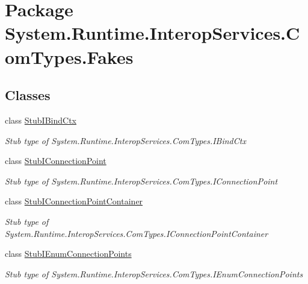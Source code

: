 \hypertarget{namespace_system_1_1_runtime_1_1_interop_services_1_1_com_types_1_1_fakes}{\section{Package System.\-Runtime.\-Interop\-Services.\-Com\-Types.\-Fakes}
\label{namespace_system_1_1_runtime_1_1_interop_services_1_1_com_types_1_1_fakes}
}
\subsection*{Classes}
\begin{DoxyCompactItemize}
\item 
class \hyperlink{class_system_1_1_runtime_1_1_interop_services_1_1_com_types_1_1_fakes_1_1_stub_i_bind_ctx}{Stub\-I\-Bind\-Ctx}
\begin{DoxyCompactList}\small\item\em Stub type of System.\-Runtime.\-Interop\-Services.\-Com\-Types.\-I\-Bind\-Ctx\end{DoxyCompactList}\item 
class \hyperlink{class_system_1_1_runtime_1_1_interop_services_1_1_com_types_1_1_fakes_1_1_stub_i_connection_point}{Stub\-I\-Connection\-Point}
\begin{DoxyCompactList}\small\item\em Stub type of System.\-Runtime.\-Interop\-Services.\-Com\-Types.\-I\-Connection\-Point\end{DoxyCompactList}\item 
class \hyperlink{class_system_1_1_runtime_1_1_interop_services_1_1_com_types_1_1_fakes_1_1_stub_i_connection_point_container}{Stub\-I\-Connection\-Point\-Container}
\begin{DoxyCompactList}\small\item\em Stub type of System.\-Runtime.\-Interop\-Services.\-Com\-Types.\-I\-Connection\-Point\-Container\end{DoxyCompactList}\item 
class \hyperlink{class_system_1_1_runtime_1_1_interop_services_1_1_com_types_1_1_fakes_1_1_stub_i_enum_connection_points}{Stub\-I\-Enum\-Connection\-Points}
\begin{DoxyCompactList}\small\item\em Stub type of System.\-Runtime.\-Interop\-Services.\-Com\-Types.\-I\-Enum\-Connection\-Points\end{DoxyCompactList}\item 

\end{DoxyCompactItemize}
